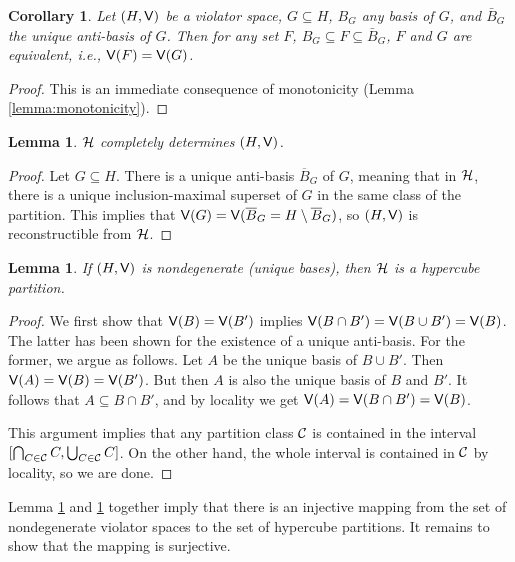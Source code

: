 \documentclass[12pt]{article}
\def\Violators{{\sf V}}
\newtheorem{lemma2}[theorem2]{Lemma}
\newenvironment{lemma}{\begin{lemma2}}{\end{lemma2}}
\newtheorem{corollary2}[theorem2]{Corollary}
\newenvironment{corollary}{\begin{corollary2}}{\end{corollary2}}
\theoremstyle{remark}
\begin{document}
   \begin{corollary}
   Let $(H,\Violators)$ be a violator space, $G\subseteq H$, $B_G$ any basis of $G$, and $\bar{B}_G
$
   the unique anti-basis of $G$. Then for any set $F$, $B_G\subseteq F \subseteq \bar{B}_G$, $F$
   and $G$ are equivalent, i.e., $\Violators(F)= \Violators(G)$.
   \end{corollary}
   \begin{proof}
   This is an immediate consequence of monotonicity (Lemma \ref{lemma:monotonicity}).
   \end{proof}

\begin{lemma}
\label{lemma:patterndetspace}
${\cal H}$ completely determines $(H,\Violators)$.
\end{lemma}

\begin{proof} Let $G\subseteq H$. There is a unique anti-basis
$\overline{B}_G$ of $G$, meaning that in ${\cal H}$, there is a unique
inclusion-maximal superset of $G$ in the same class of the partition.
This implies that $\Violators(G)=\Violators(\overline{B}_G=H\setminus\overline{B}_G)$, so
$(H,\Violators)$ is reconstructible from ${\cal H}$.
\end{proof}

\begin{lemma}
\label{lemma:nondegdetpartition}
If $(H,\Violators)$ is nondegenerate (unique bases), then ${\cal H}$ is a hypercube
partition. 
\end{lemma}

\begin{proof}
We first show that $\Violators(B)=\Violators(B')$ implies $\Violators(B\cap B')=\Violators(B\cup
B')=\Violators(B)$. The latter has been shown for the existence of a unique
anti-basis. For the former, we argue as follows. Let $A$ be the unique
basis of $B\cup B'$. Then $\Violators(A)=\Violators(B)=\Violators(B')$. But then $A$ is also the
unique basis of $B$ and $B'$. It follows that $A\subseteq B\cap B'$,
and by locality we get $\Violators(A)=\Violators(B\cap B')=\Violators(B)$.

This argument implies that any partition class ${\cal C}$ is contained
in the interval
$[\bigcap_{C\in{\cal C}}C, \bigcup_{C\in{\cal C}}C]$.
On the other hand, the whole interval is contained in ${\cal C}$ by locality,
so we are done. 
\end{proof}

Lemma \ref{lemma:patterndetspace} and  \ref{lemma:nondegdetpartition}
together imply that there is an injective mapping 
from the set of nondegenerate violator spaces to the set of hypercube
partitions. It remains to show that the mapping is surjective.
\end{document}
